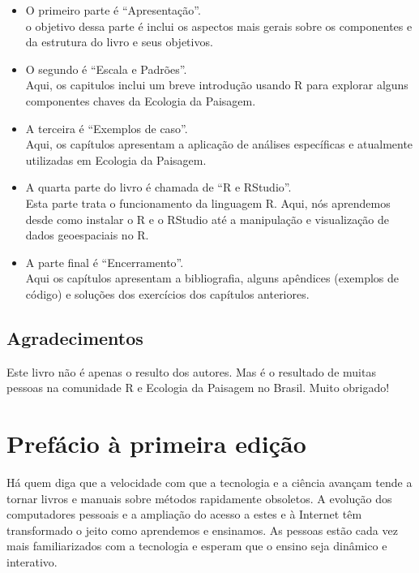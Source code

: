 \documentclass[
]{article}
\begin{document}
\begin{itemize}
\item
  O primeiro parte é ``Apresentação''.\\
  o objetivo dessa parte é inclui os aspectos mais gerais sobre os componentes e da estrutura do livro e seus objetivos.
\item
  O segundo é ``Escala e Padrões''.\\
  Aqui, os capitulos inclui um breve introdução usando R para explorar alguns componentes chaves da Ecologia da Paisagem.
\item
  A terceira é ``Exemplos de caso''.\\
  Aqui, os capítulos apresentam a aplicação de análises específicas e atualmente utilizadas em Ecologia da Paisagem.
\item
  A quarta parte do livro é chamada de ``R e RStudio''.\\
  Esta parte trata o funcionamento da linguagem R. Aqui, nós aprendemos desde como instalar o R e o RStudio até a manipulação e visualização de dados geoespaciais no R.
\item
  A parte final é ``Encerramento''.\\
  Aqui os capítulos apresentam a bibliografia, alguns apêndices (exemplos de código) e soluções dos exercícios dos capítulos anteriores.
\end{itemize}

\hypertarget{agradecimentos}{%
\subsection*{Agradecimentos}\label{agradecimentos}}

Este livro não é apenas o resulto dos autores. Mas é o resultado de muitas pessoas na comunidade R e Ecologia da Paisagem no Brasil.
Muito obrigado!

\newpage{}

\hypertarget{prefuxe1cio-uxe0-primeira-ediuxe7uxe3o}{%
\section*{Prefácio à primeira edição}\label{prefuxe1cio-uxe0-primeira-ediuxe7uxe3o}}

Há quem diga que a velocidade com que a tecnologia e a ciência avançam tende a tornar livros e manuais sobre métodos rapidamente obsoletos. A evolução dos computadores pessoais e a ampliação do acesso a estes e à Internet têm transformado o jeito como aprendemos e ensinamos. As pessoas estão cada vez mais familiarizados com a tecnologia e esperam que o ensino seja dinâmico e interativo.
\end{document}
